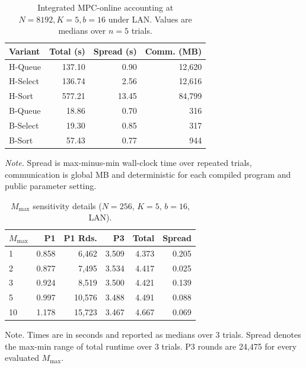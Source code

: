 \documentclass[conference,compsoc,letterpaper]{IEEEtran}
\theoremstyle{definition}
\theoremstyle{remark}
\newcommand{\Mmax}{M_{\max}}
\newcommand{\scorebits}{b}
\newcommand{\HSort}{H-Sort}
\newcommand{\HQueue}{H-Queue}
\newcommand{\HSelect}{H-Select}
\newcommand{\BSort}{B-Sort}
\newcommand{\BQueue}{B-Queue}
\newcommand{\BSelect}{B-Select}
\begin{document}
\begin{table}[t]
\centering
\small
\caption{Integrated MPC-online accounting at \(N=8192,K=5,b=16\) under
LAN. Values are medians over \(n=5\) trials.}
\label{tab:app_multiscale_selected}
\begin{tabular}{@{}lrrr@{}}
\toprule
\textbf{Variant} & \textbf{Total (s)} &
\textbf{Spread (s)} & \textbf{Comm. (MB)} \\
\midrule
\HQueue{}  & 137.10 &  0.90 & 12{,}620 \\
\HSelect{} & 136.74 &  2.56 & 12{,}616 \\
\HSort{}   & 577.21 & 13.45 & 84{,}799 \\
\BQueue{}  &  18.86 &  0.70 &    316 \\
\BSelect{} &  19.30 &  0.85 &    317 \\
\BSort{}   &  57.43 &  0.77 &    944 \\
\bottomrule
\end{tabular}

\vspace{2pt}
\footnotesize
\parbox{\linewidth}{
\emph{Note.} Spread is max-minus-min wall-clock time over repeated
trials, communication is global MB and deterministic for each compiled
program and public parameter setting.}
\vspace{-1mm}

\end{table}

\smallskip

\begin{table}[t]
\centering
\small
\caption{$\Mmax$ sensitivity details ($N=256$, $K=5$, $\scorebits=16$, LAN).}
\label{tab:app_mmax_sensitivity}
\begin{tabular}{@{}lrrrrr@{}}
\toprule
$\Mmax$ & \textbf{P1} & \textbf{P1 Rds.} &
\textbf{P3} & \textbf{Total} & \textbf{Spread} \\
\midrule
1  & 0.858 &  6{,}462 & 3.509 & 4.373 & 0.205 \\
2  & 0.877 &  7{,}495 & 3.534 & 4.417 & 0.025 \\
3  & 0.924 &  8{,}519 & 3.500 & 4.421 & 0.139 \\
5  & 0.997 & 10{,}576 & 3.488 & 4.491 & 0.088 \\
10 & 1.178 & 15{,}723 & 3.467 & 4.667 & 0.069 \\
\bottomrule
\end{tabular}

\vspace{2pt}
\footnotesize
\parbox{\linewidth}{
{Note.} Times are in seconds and reported as medians over $3$ trials.
Spread denotes the max-min range of total runtime over $3$ trials.
P3 rounds are 24{,}475 for every evaluated $\Mmax$.}
\vspace{-3mm}

\end{table}
\end{document}
